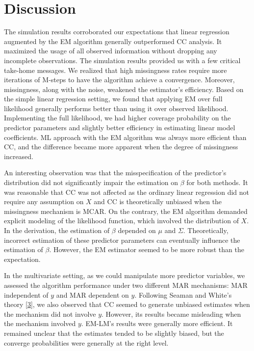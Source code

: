 \documentclass[
  twocolumn]{article}
\begin{document}
\hypertarget{discussion}{%
\section{Discussion}\label{discussion}}

The simulation results corroborated our expectations that linear
regression augmented by the EM algorithm generally outperformed CC
analysis. It maximized the usage of all observed information without
dropping any incomplete observations. The simulation results provided us
with a few critical take-home messages. We realized that high
missingness rates require more iterations of M-steps to have the
algorithm achieve a convergence. Moreover, missingness, along with the
noise, weakened the estimator's efficiency. Based on the simple linear
regression setting, we found that applying EM over full likelihood
generally performs better than using it over observed likelihood.
Implementing the full likelihood, we had higher coverage probability on
the predictor parameters and slightly better efficiency in estimating
linear model coefficients. ML approach with the EM algorithm was always
more efficient than CC, and the difference became more apparent when the
degree of missingness increased.

An interesting observation was that the misspecification of the
predictor's distribution did not significantly impair the estimation on
\(\beta\) for both methods. It was reasonable that CC was not affected
as the ordinary linear regression did not require any assumption on
\(X\) and CC is theoretically unbiased when the missingness mechanism is
MCAR. On the contrary, the EM algorithm demanded explicit modeling of
the likelihood function, which involved the distribution of \(X\). In
the derivation, the estimation of \(\beta\) depended on \(\mu\) and
\(\Sigma\). Theoretically, incorrect estimation of these predictor
parameters can eventually influence the estimation of \(\beta\).
However, the EM estimator seemed to be more robust than the expectation.

In the multivariate setting, as we could manipulate more predictor
variables, we assessed the algorithm performance under two different MAR
mechanisms: MAR independent of \(y\) and MAR dependent on \(y\).
Following Seaman and White's theory
{[}\protect\hyperlink{ref-seaman2013review}{3}{]}, we also observed that
CC seemed to generate unbiased estimates when the mechanism did not
involve \(y\). However, its results became misleading when the mechanism
involved \(y\). EM-LM's results were generally more efficient. It
remained unclear that the estimates tended to be slightly biased, but
the converge probabilities were generally at the right level.
\end{document}
